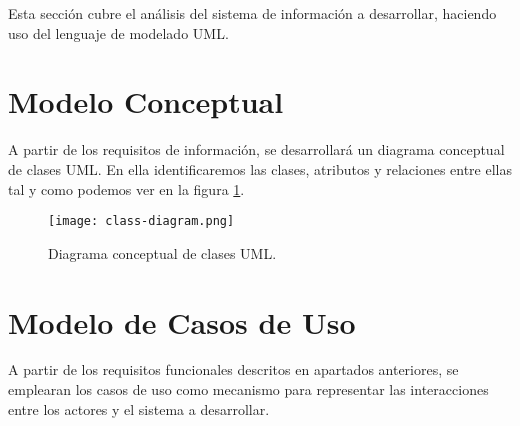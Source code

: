 

Esta sección cubre el análisis del sistema de información a desarrollar, haciendo uso del lenguaje de modelado UML.

\section{Modelo Conceptual}
A partir de los requisitos de información, se desarrollará un diagrama conceptual de clases UML. En ella identificaremos las clases, atributos y relaciones entre ellas tal y como podemos ver en la figura \ref{fig:digclases}.

\begin{figure}[!hpt]
	\begin{center} 
		\texttt{[image: class-diagram.png]}
		\caption{Diagrama conceptual de clases UML.}
		\label{fig:digclases}
	\end{center}
\end{figure}


\section{Modelo de Casos de Uso}
A partir de los requisitos funcionales descritos en apartados anteriores, se emplearan los casos de uso como mecanismo para representar las interacciones entre los actores y el sistema a desarrollar.

